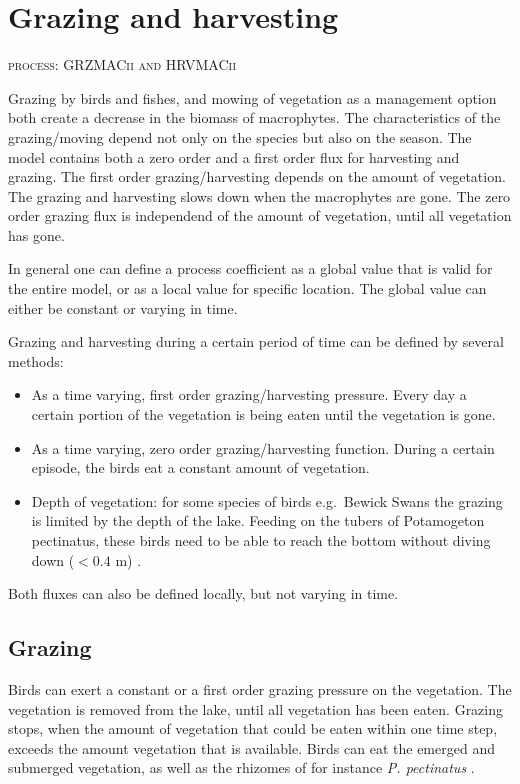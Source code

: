 \section{Grazing and harvesting}
\label{GrazingHarvesting}
\begin{flushright}
\textsc{process: GRZMACii and HRVMACii}
\end{flushright}

Grazing by birds and fishes, and mowing of vegetation as a management option both create a decrease in the biomass of macrophytes.
The characteristics of the grazing/moving depend not only on the species but also on the season.
The model contains both a zero order and a first order flux for harvesting and grazing.
The first order grazing/harvesting depends on the amount of vegetation.
The grazing and harvesting slows down when the macrophytes are gone.
The zero order grazing flux is independend of the amount of vegetation, until all vegetation has gone.

In general one can define a process coefficient as a global value that is valid for the entire model, or as a local value for  specific location.
The global value can either be constant or varying in time.

Grazing and harvesting during a certain period of time can be defined by several methods:
\begin{itemize}
\item
As a time varying, first order grazing/harvesting pressure. Every day a certain portion of the vegetation is being eaten until the vegetation is gone.
\item
As a time varying, zero order grazing/harvesting function. During a certain episode, the birds eat a constant amount of vegetation.
\item
Depth of vegetation: for some species of birds e.g.\ Bewick Swans the grazing is limited by the depth of the lake.
Feeding on the tubers of Potamogeton pectinatus, these birds need to be able to reach the bottom without diving down ($<0.4$  m) \citet{LiteratureReference}.
\end{itemize}

Both fluxes can also be defined locally, but not varying in time.

\subsection{Grazing}
Birds can exert a constant or a first order grazing pressure on the vegetation. The vegetation is removed
from the lake, until all vegetation has been eaten. Grazing stops, when the amount of vegetation that could
be eaten within one time step, exceeds the amount vegetation that is available. Birds can eat the emerged
and submerged vegetation, as well as the rhizomes of for instance \emph{P. pectinatus} \cite{REF}.

